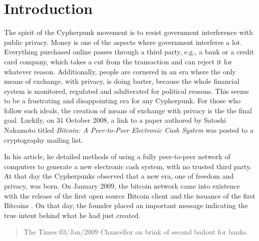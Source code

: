\documentclass[../../thesis.tex]{subfiles}
\begin{document}
\section{Introduction}
\label{sec: bitcoin_introduction}



The spirit of the Cypherpunk movement is to resist government interference with public privacy. Money is one of the aspects where government interferes a lot. Everything purchased online passes through a third party, e.g., a bank or a credit card company, which takes a cut from the transaction and can reject it for whatever reason. Additionally, people are cornered in an era where the only means of exchange, with privacy, is doing barter, because the whole financial system is monitored, regulated and adulterated for political reasons. This seems to be a frustrating and disappointing era for any Cypherpunk. For those who follow such ideals, the creation of means of exchange with privacy is the the final goal. Luckily, on 31 October 2008, a link to a paper authored by Satoshi Nakamoto titled \textit{Bitcoin: A Peer-to-Peer Electronic Cash System}\cite{nakamoto2008bitcoin} was posted to a cryptography mailing list\cite{satoshiMail1}\cite{satoshiMail2}. 

In his article, he detailed methods of using a fully peer-to-peer network of computers to generate a new electronic cash system, with no trusted third party. At that day the Cypherpunks observed that a new era, one of freedom and privacy, was born. On January 2009, the bitcoin network came into existence with the release of the first open source Bitcoin client and the issuance of the first Bitcoins \cite{V1Bitcoin1}\cite{V1Bitcoin2}\cite{V1Bitcoin3}. On that day, the founder placed an important message indicating the true intent behind what he had just created.
\begin{quotation}
  The Times 03/Jan/2009 Chancellor on brink of second bailout for banks.
\end{quotation}
\end{document}
